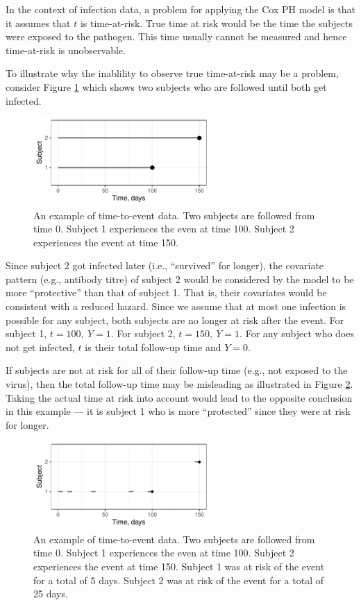 In the context of infection data, a problem for applying the Cox PH model is that it assumes that $t$ is time-at-risk. True time at risk would be the time the subjects were exposed to the pathogen. This time usually cannot be measured and hence time-at-risk is unobservable.

To illustrate why the inablility to observe true time-at-risk may be a problem, consider Figure \ref{CoxExampleFull} which shows two subjects who are followed until both get infected.

\begin{figure}[htp]
	\centering
	\includegraphics[width=0.6\textwidth]{../curve-cox/timeplot_1_light.pdf}
	\caption{
	An example of time-to-event data. Two subjects are followed from time 0. Subject 1 experiences the even at time 100. Subject 2 experiences the event at time 150.
	}
	\label{CoxExampleFull}
\end{figure}

Since subject 2 got infected later (i.e., ``survived'' for longer), the covariate pattern (e.g., antibody titre) of subject 2 would be considered by the model to be more ``protective'' than that of subject 1. That is, their covariates would be consistent with a reduced hazard. Since we assume that at most one infection is possible for any subject, both subjects are no longer at risk after the event. For subject 1, $t=100,\ Y=1$. For subject 2, $t=150,\ Y=1$. For any subject who does not get infected, $t$ is their total follow-up time and $Y=0$.

If subjects are not at risk for all of their follow-up time (e.g., not exposed to the virus), then the total follow-up time may be misleading as illustrated in Figure \ref{CoxExamplePartial}. Taking the actual time at risk into account would lead to the opposite conclusion in this example --- it is subject 1 who is more ``protected'' since they were at risk for longer.

\begin{figure}[htp]
	\centering
	\includegraphics[width=0.6\textwidth]{../curve-cox/timeplot_2_light.pdf}
	\caption{
	An example of time-to-event data. Two subjects are followed from time 0. Subject 1 experiences the even at time 100. Subject 2 experiences the event at time 150. Subject 1 was at risk of the event for a total of 5 days. Subject 2 was at risk of the event for a total of 25 days.
	}
	\label{CoxExamplePartial}
\end{figure}

